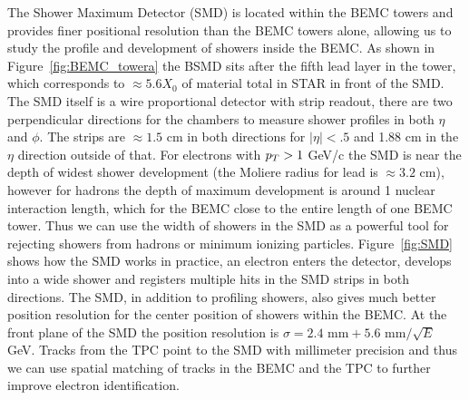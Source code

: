 The Shower Maximum Detector (SMD) is located within the BEMC towers and provides finer positional resolution than the BEMC towers alone, allowing us to study the profile and development of showers inside the BEMC. As shown in Figure~\ref{fig:BEMC_towera} the BSMD sits after the fifth lead layer in the tower, which corresponds to $\approx 5.6 X_{0}$ of material total in STAR in front of the SMD. The SMD itself is a wire proportional detector with strip readout, there are two perpendicular directions for the chambers to measure shower profiles in both $\eta$ and $\phi$. The strips are $\approx 1.5$ cm in both directions for $|\eta| < .5$ and 1.88 cm in the $\eta$ direction outside of that. For electrons with $p_{T} > 1$ GeV/c the SMD is near the depth of widest shower development (the Moliere radius for lead is $\approx 3.2$ cm), however for hadrons the depth of maximum development is around 1 nuclear interaction length, which for the BEMC close to the entire length of one BEMC tower. Thus we can use the width of showers in the SMD as a powerful tool for rejecting showers from hadrons or minimum ionizing particles. Figure~\ref{fig:SMD} shows how the SMD works in practice, an electron enters the detector, develops into a wide shower and registers multiple hits in the SMD strips in both directions. The SMD, in addition to profiling showers, also gives much better position resolution for the center position of showers within the BEMC. At the front plane of the SMD the position resolution is $\sigma = 2.4 \text{ mm} + 5.6 \text{ mm}/\sqrt{E}$ GeV. Tracks from the TPC point to the SMD with millimeter precision and thus we can use spatial matching of tracks in the BEMC and the TPC to further improve electron identification.


